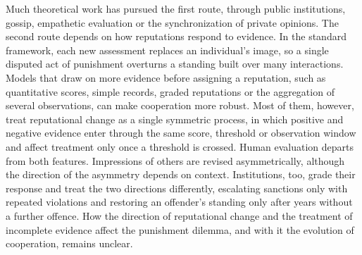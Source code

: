 Much theoretical work has pursued the first route, through public institutions, gossip, empathetic evaluation or the synchronization of private opinions\cite{radzvilavicius2021,kawakatsu2024,radzvilavicius2019,murase2024synchronization,tham2026}. The second route depends on how reputations respond to evidence. In the standard framework, each new assessment replaces an individual's image, so a single disputed act of punishment overturns a standing built over many interactions\cite{ohtsuki2004,hilbe2018}. Models that draw on more evidence before assigning a reputation, such as quantitative scores, simple records, graded reputations or the aggregation of several observations, can make cooperation more robust\cite{schmid2023,clark2020,tanabe2013,murase2022,michelmata2024,yamamoto2025}. Most of them, however, treat reputational change as a single symmetric process, in which positive and negative evidence enter through the same score, threshold or observation window and affect treatment only once a threshold is crossed. Human evaluation departs from both features. Impressions of others are revised asymmetrically, although the direction of the asymmetry depends on context\cite{skowronski1989,slovic1993,mendesiedlecki2013diagnostic,siegel2018}. Institutions, too, grade their response and treat the two directions differently, escalating sanctions only with repeated violations\cite{ostrom1990,cox2010} and restoring an offender's standing only after years without a further offence\cite{blumstein2009}. How the direction of reputational change and the treatment of incomplete evidence affect the punishment dilemma, and with it the evolution of cooperation, remains unclear.
